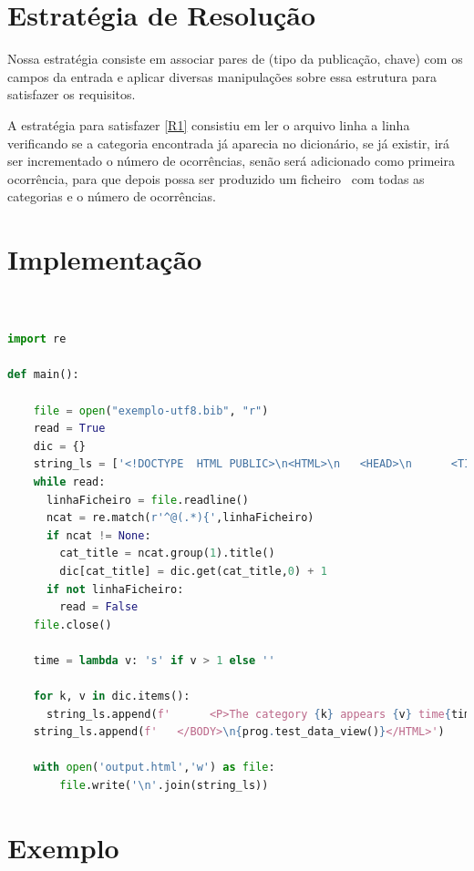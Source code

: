 \documentclass[11pt,a4paper]{report}
\begin{document}
\section{Estratégia de Resolução}

Nossa estratégia consiste em associar pares de (tipo da publicação, chave) com os campos da entrada e aplicar diversas manipulações sobre essa estrutura para satisfazer os requisitos.

A estratégia para satisfazer \ref{R1} consistiu em ler o arquivo linha a linha verificando se a categoria encontrada já aparecia no dicionário, se já existir, irá ser incrementado o número de ocorrências, senão será adicionado como primeira ocorrência, para que depois possa ser produzido um ficheiro \htlm \ com todas as categorias e o número de ocorrências.

\section{Implementação}


\begin{lstlisting}[language=python]


import re

def main():
    
    file = open("exemplo-utf8.bib", "r")
    read = True
    dic = {}
    string_ls = ['<!DOCTYPE  HTML PUBLIC>\n<HTML>\n   <HEAD>\n      <TITLE>Categories in BibTeX</TITLE>\n   </HEAD>\n   <BODY>']
    while read:
      linhaFicheiro = file.readline()
      ncat = re.match(r'^@(.*){',linhaFicheiro)
      if ncat != None:
        cat_title = ncat.group(1).title()
        dic[cat_title] = dic.get(cat_title,0) + 1
      if not linhaFicheiro:
        read = False
    file.close()

    time = lambda v: 's' if v > 1 else ''

    for k, v in dic.items():
      string_ls.append(f'      <P>The category {k} appears {v} time{time(v)}.</P>')
    string_ls.append(f'   </BODY>\n{prog.test_data_view()}</HTML>')

    with open('output.html','w') as file:
        file.write('\n'.join(string_ls))
\end{lstlisting}

\section{Exemplo}
\end{document}
